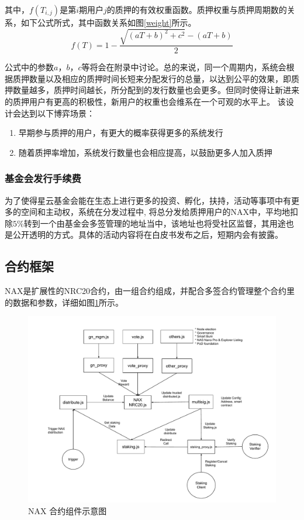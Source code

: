 其中，\(f(T_{i,j})\)是第\(i\)期用户\(j\)的质押的有效权重函数。质押权重与质押周期数的关系，如下公式所式，其中函数关系如图\ref{weight}所示。
\begin{equation}
  f(T) = 1 - \frac{\sqrt{(aT+b)^2+c^2}-(aT+b)}{2}
\end{equation}

公式中的参数$a$，$b$，$c$等将会在附录中讨论。总的来说，同一个周期内，系统会根据质押数量以及相应的质押时间长短来分配发行的总量，以达到公平的效果，即质押数量越多，质押时间越长，所分配到的发行数量也会更多。但同时使得让新进来的质押用户有更高的积极性，新用户的权重也会维系在一个可观的水平上。 该设计会达到以下博弈场景：

\begin{enumerate}[\hspace{1cm}(a)]
  \item 早期参与质押的用户，有更大的概率获得更多的系统发行
  \item 随着质押率增加，系统发行数量也会相应提高，以鼓励更多人加入质押
\end{enumerate}

\subsubsection{基金会发行手续费}
为了使得星云基金会能在生态上进行更多的投资、孵化，扶持，活动等事项中有更多的空间和主动权，系统在分发过程中, 将总分发给质押用户的NAX中，平均地扣除$5\%$转到一个由基金会多签管理的地址当中，该地址也将受社区监督，其用途也是公开透明的方式。具体的活动内容将在白皮书发布之后，短期内会有披露。

\subsection{合约框架}
NAX是扩展性的NRC20合约，由一组合约组成，并配合多签合约管理整个合约里的数据和参数，详细如图\ref{fig:nax_framework}所示。

\begin{figure}[htbp]
  \centering
    \includegraphics[width=1\textwidth]{../common/nax.pdf}
    \caption{NAX 合约组件示意图 \label{fig:nax_framework}}
\end{figure}
